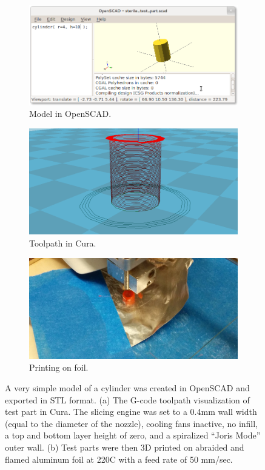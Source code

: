 \documentclass[fleqn,10pt]{wlpeerj}
\begin{document}
\begin{figure}
    \centering
    \begin{subfigure}[b]{0.32\textwidth}
        \centering
        \includegraphics[width=\textwidth]{test_part_openscad}
        \caption{Model in OpenSCAD.}
        \label{fig:openscad}
    \end{subfigure}
    \hfill
    \begin{subfigure}[b]{0.32\textwidth}
        \centering
        \includegraphics[width=\textwidth]{test_part_cura}
        \caption{Toolpath in Cura.}
        \label{fig:cura}
    \end{subfigure}
    \hfill
    \begin{subfigure}[b]{0.32\textwidth}
        \centering
        \includegraphics[width=\textwidth]{foil_printing}
        \caption{Printing on foil.}
        \label{fig:foil}
    \end{subfigure}
    \caption{A very simple model of a cylinder was created in OpenSCAD and exported in STL format. (a) The G-code toolpath visualization of test part in Cura. The slicing engine was set to a 0.4mm wall width (equal to the diameter of the nozzle), cooling fans inactive, no infill, a top and bottom layer height of zero, and a spiralized ``Joris Mode'' outer wall. (b) Test parts were then 3D printed on abraided and flamed aluminum foil at 220C with a feed rate of 50 mm/sec. }
 

\end{figure}
\end{document}
